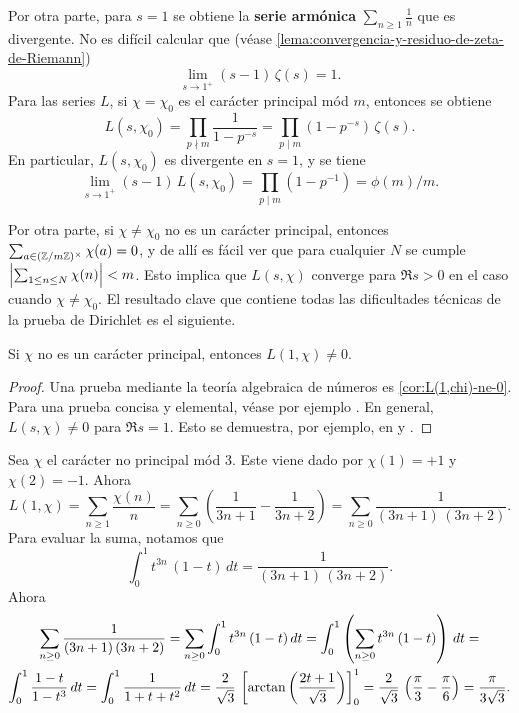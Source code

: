 Por otra parte, para $s = 1$ se obtiene la \textbf{serie armónica}
$\sum_{n\ge 1} \frac{1}{n}$ que es divergente. No es difícil calcular que (véase \ref{lema:convergencia-y-residuo-de-zeta-de-Riemann})
\begin{equation}
  \label{eq:residuo-de-zeta-en-1}
  \lim_{s\to 1^+} (s-1) \, \zeta (s) = 1.
\end{equation}
Para las series $L$, si $\chi = \chi_0$ es el carácter principal mód $m$,
entonces se obtiene
\[ L (s, \chi_0) = \prod_{p \nmid m} \frac{1}{1 - p^{-s}}
   = \prod_{p \mid m} (1 - p^{-s}) \, \zeta (s). \]
En particular, $L (s, \chi_0)$ es divergente en $s = 1$, y se tiene
\[ \lim_{s\to 1^+} (s-1)\,L (s, \chi_0) = \prod_{p \mid m} (1 - p^{-1})
   = \phi (m)/m. \]

Por otra parte, si $\chi \ne \chi_0$ no es un carácter principal, entonces
$\sum_{a \in (\mathbb{Z}/m\mathbb{Z})^\times} \chi (a) = 0$, y de allí es fácil ver que
para cualquier $N$ se cumple $\Bigl|\sum_{1 \le n \le N} \chi (n)\Bigr| < m$.
Esto implica que $L (s,\chi)$ converge para $\Re s > 0$ en el caso cuando
$\chi \ne \chi_0$. El resultado clave que contiene todas las dificultades
técnicas de la prueba de Dirichlet es el siguiente.

\begin{teorema}
  \label{thm:L(1,chi)}
  Si $\chi$ no es un carácter principal, entonces $L (1,\chi) \ne 0$.

  \begin{proof}
    Una prueba mediante la teoría algebraica de números es
    \ref{cor:L(1,chi)-ne-0}. Para una prueba concisa y elemental, véase por
    ejemplo \cite[\S 16.5]{Ireland-Rosen}. En general, $L (s,\chi) \ne 0$ para
    $\Re s = 1$. Esto se demuestra, por ejemplo, en
    \cite[Chapter~5]{Everiste-ANT} y
    \cite[Chapter~6]{Hlawka-Taschner-Schoissengeier}.
  \end{proof}
\end{teorema}

\begin{ejemplo}
  Sea $\chi$ el carácter no principal mód $3$. Este viene dado por
  $\chi (1) = +1$ y $\chi (2) = -1$. Ahora
  $$L (1,\chi) = \sum_{n \ge 1} \frac{\chi (n)}{n} = \sum_{n \ge 0} \left(\frac{1}{3n + 1} - \frac{1}{3n+2}\right) = \sum_{n \ge 0} \frac{1}{(3n+1)\,(3n+2)}.$$
  Para evaluar la suma, notamos que
  $$\int_0^1 t^{3n} \, (1-t) \, dt = \frac{1}{(3n+1)\,(3n+2)}.$$
  Ahora
  \begin{multline*}
    \sum_{n \ge 0} \frac{1}{(3n+1)\,(3n+2)} = \sum_{n \ge 0} \int_0^1 t^{3n} \, (1-t) \, dt = \int_0^1 \left(\sum_{n \ge 0} t^{3n} \, (1-t)\right) \, dt =\\
    \int_0^1 \frac{1-t}{1-t^3}\,dt = \int_0^1 \frac{1}{1 + t + t^2}\,dt = \frac{2}{\sqrt{3}}\,\left[\arctan \left(\frac{2t+1}{\sqrt{3}}\right)\right]_0^1 = \frac{2}{\sqrt{3}}\,\left(\frac{\pi}{3} - \frac{\pi}{6}\right) = \frac{\pi}{3\sqrt{3}}. \qedhere
  \end{multline*}
\end{ejemplo}

